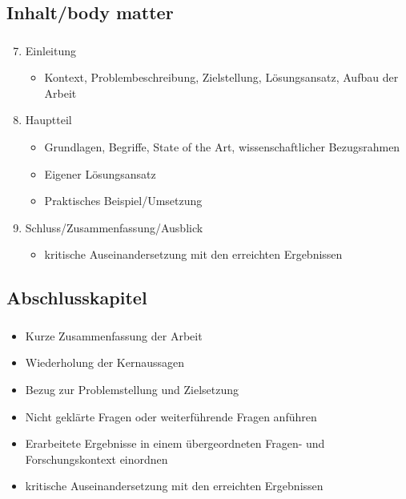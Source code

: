 \documentclass[aspectratio=169]{beamer}
\begin{document}
\subsection{Inhalt/body matter}
\begin{frame}
  \frametitle{\insertsection}%
  \framesubtitle{\insertsubsection}%
  \begin{enumerate}
   \setcounter{enumi}{6}
   \item Einleitung
   \begin{itemize}
    \item Kontext, Problembeschreibung, Zielstellung, Lösungsansatz, Aufbau der Arbeit
   \end{itemize}
   \item Hauptteil
   \begin{itemize}
    \item Grundlagen, Begriffe, State of the Art, wissenschaftlicher Bezugsrahmen
    \item Eigener Lösungsansatz
    \item Praktisches Beispiel/Umsetzung
   \end{itemize}
   \item Schluss/Zusammenfassung/Ausblick
   \begin{itemize}
    \item kritische Auseinandersetzung mit den erreichten Ergebnissen
   \end{itemize}
  \end{enumerate}
\end{frame}

\subsection{Abschlusskapitel}
\begin{frame}
  \frametitle{\insertsection}%
  \framesubtitle{\insertsubsection}%
  \begin{itemize}
   \item Kurze Zusammenfassung der Arbeit
   \item Wiederholung der Kernaussagen
   \item Bezug zur Problemstellung und Zielsetzung
   \item Nicht geklärte Fragen oder weiterführende Fragen anführen
   \item Erarbeitete Ergebnisse in einem übergeordneten Fragen- und Forschungskontext einordnen
   \item kritische Auseinandersetzung mit den erreichten Ergebnissen
  \end{itemize}
\end{frame}
\end{document}
